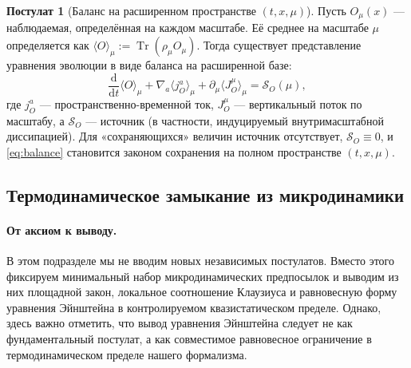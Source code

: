 \documentclass[11pt,a4paper]{article}
\DeclareMathOperator{\Tr}{Tr}
\newcommand{\dd}{\mathrm{d}}
\theoremstyle{definition}
\newtheorem{axiom}{Постулат}[section]
\theoremstyle{plain}
\theoremstyle{remark}
\begin{document}
\begin{axiom}[Баланс на расширенном пространстве $(t,x,\mu)$]\label{ax:balance}
Пусть $O_\mu(x)$ — наблюдаемая, определённая на каждом масштабе.
Её среднее на масштабе $\mu$ определяется как $\langle O\rangle_\mu := \Tr(\rho_\mu O_\mu)$.
Тогда существует представление уравнения эволюции в виде баланса на расширенной базе:
\begin{equation}\label{eq:balance}
\frac{\dd}{\dd t}\langle O\rangle_\mu
+
\nabla_a\langle j_O^a\rangle_\mu
+
\partial_\mu\langle J_O^\mu\rangle_\mu
=
\mathcal S_O(\mu),
\end{equation}
где $j_O^a$ — пространственно-временной ток, $J_O^\mu$ — вертикальный поток по масштабу,
а $\mathcal S_O$ — источник (в частности, индуцируемый внутримасштабной диссипацией).
Для «сохраняющихся» величин источник отсутствует, $\mathcal S_O\equiv 0$, и \eqref{eq:balance} становится законом сохранения
на полном пространстве $(t,x,\mu)$.
\end{axiom}

\subsection{Термодинамическое замыкание из микродинамики}
\label{sec:axioms:thermo}

\paragraph{От аксиом к выводу.}
В этом подразделе мы не вводим новых независимых постулатов.
Вместо этого фиксируем минимальный набор микродинамических предпосылок и выводим из них
площадной закон, локальное соотношение Клаузиуса \cite{Callen1985Thermostatistics} и равновесную форму уравнения Эйнштейна
в контролируемом квазистатическом пределе. Однако, здесь важно отметить, что вывод уравнения Эйнштейна следует не как фундаментальный постулат, а как совместимое равновесное ограничение в термодинамическом пределе нашего формализма.
\end{document}

